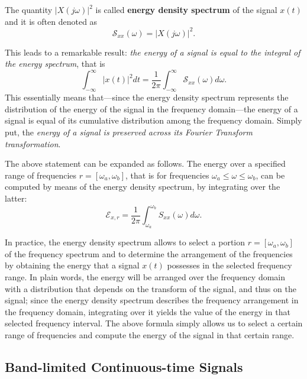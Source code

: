 \documentclass[\documentfontsize, twocolumn]{\classname}
\begin{document}
The quantity $\left|X(j\omega)\right|^2$ is called \textbf{energy density spectrum} of the signal $x(t)$ and it is often denoted as
\begin{equation}\label{eqn:energyDensitySpectrum}
    \mathcal S_{xx}(\omega)=\left|X(j\omega)\right|^2.
\end{equation}

This leads to a remarkable result: \emph{the energy of a signal is equal to the
integral of the energy spectrum}, that is
\begin{equation}\label{enq:energyDensitySpectrumEquivalence}
        \int_{-\infty}^\infty|x(t)|^2dt = \frac 1 {2\pi} \int_{-\infty}^\infty\mathcal S_{xx}(\omega) d\omega.
\end{equation}
This essentially means that---since the energy density spectrum represents the
distribution of the energy of the signal in the frequency domain---the energy
of a signal is equal of its cumulative distribution among the frequency domain.
Simply put, the \emph{energy of a signal is preserved across its Fourier
Transform transformation}.

The above statement can be expanded as follows. The energy over a specified
range of frequencies $r = [\omega_a, \omega_b]$, that is for frequencies
$\omega_a \leq \omega \leq \omega_b$, can be computed by means of the energy
density spectrum, by integrating over the latter:
\begin{equation}\label{eqn:energyDensitySpectrumComputation}
    \mathcal E_{x,r} = \frac 1 {2\pi} \int_{\omega_a}^{\omega_b} S_{xx}(\omega)d\omega.
\end{equation}

In practice, the energy density spectrum allows to select a portion $r =
[\omega_a, \omega_b]$ of the frequency spectrum and to determine the
arrangement of the frequencies by obtaining the energy that a signal $x(t)$
possesses in the selected frequency range. In plain words, the energy will be
arranged over the frequency domain with a distribution that depends on the
transform of the signal, and thus on the signal; since the energy density
spectrum describes the frequency arrangement in the frequency domain,
integrating over it yields the value of the energy in that selected frequency
interval. The above formula simply allows us to select a certain range of
frequencies and compute the energy of the signal in that certain range.

\subsection{Band-limited Continuous-time Signals}\label{sec:bandLimitedSignals}
\end{document}
